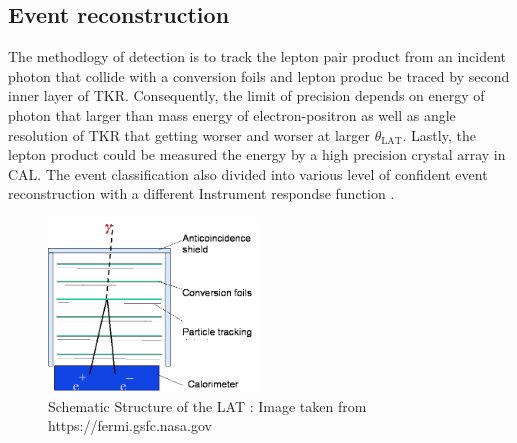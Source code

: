 \subsection{Event reconstruction}
The methodlogy of detection is to track the lepton pair product from an incident photon that collide with a conversion foils and lepton produc be traced by second inner layer of TKR.
Consequently, the limit of precision depends on energy of photon that larger than mass energy of electron-positron as well as angle resolution of TKR that getting worser and worser at larger $\theta_\text{LAT}$.
Lastly, the lepton product could be measured the energy by a high precision crystal array in CAL. The event classification also divided into various level of confident event reconstruction with a different Instrument respondse function \cite{FermiDetail,Atwood:2013rka}.


\begin{figure}[h!]
  \centering
    \includegraphics[width=0.5\textwidth]{img/LATMethodology}
    \caption{Schematic Structure of the LAT : Image taken from https://fermi.gsfc.nasa.gov}
  \end{figure}
